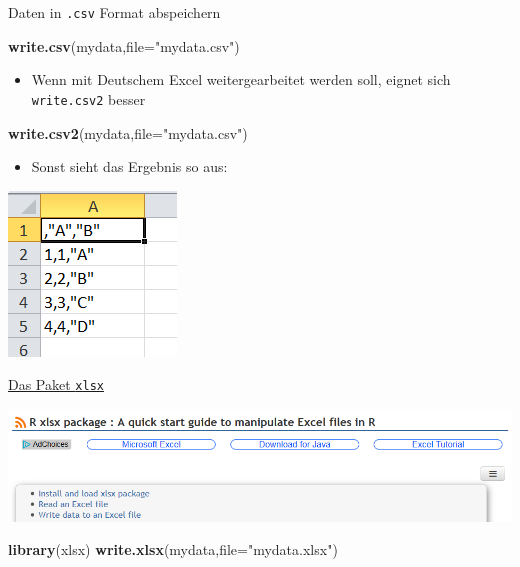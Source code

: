 \documentclass[ignorenonframetext,]{beamer}
\newenvironment{Shaded}{}{}
\newcommand{\KeywordTok}[1]{\textcolor[rgb]{0.00,0.44,0.13}{\textbf{{#1}}}}
\newcommand{\DataTypeTok}[1]{\textcolor[rgb]{0.56,0.13,0.00}{{#1}}}
\newcommand{\StringTok}[1]{\textcolor[rgb]{0.25,0.44,0.63}{{#1}}}
\newcommand{\NormalTok}[1]{{#1}}
\providecommand{\tightlist}{%
\setlength{\itemsep}{0pt}\setlength{\parskip}{0pt}}
\begin{document}
\begin{frame}[fragile]{Daten in \texttt{.csv} Format abspeichern}

\begin{Shaded}
\begin{Highlighting}[]
\KeywordTok{write.csv}\NormalTok{(mydata,}\DataTypeTok{file=}\StringTok{"mydata.csv"}\NormalTok{) }
\end{Highlighting}
\end{Shaded}

\begin{itemize}
\tightlist
\item
  Wenn mit Deutschem Excel weitergearbeitet werden soll, eignet sich
  \texttt{write.csv2} besser
\end{itemize}

\begin{Shaded}
\begin{Highlighting}[]
\KeywordTok{write.csv2}\NormalTok{(mydata,}\DataTypeTok{file=}\StringTok{"mydata.csv"}\NormalTok{) }
\end{Highlighting}
\end{Shaded}

\begin{itemize}
\tightlist
\item
  Sonst sieht das Ergebnis so aus:
\end{itemize}

\includegraphics{./tex2pdf.956/18fa31a6671691665971d435cb85f1252e5f17a0.png}

\end{frame}

\begin{frame}[fragile]{\href{http://www.sthda.com/english/wiki/r-xlsx-package-a-quick-start-guide-to-manipulate-excel-files-in-r\#read-an-excel-file}{Das
Paket \texttt{xlsx}}}

\includegraphics{./tex2pdf.956/f8e4fe7da5e630832ec7e1566b80a8d388b852cb.png}

\begin{Shaded}
\begin{Highlighting}[]
\KeywordTok{library}\NormalTok{(xlsx)}
\KeywordTok{write.xlsx}\NormalTok{(mydata,}\DataTypeTok{file=}\StringTok{"mydata.xlsx"}\NormalTok{) }
\end{Highlighting}
\end{Shaded}

\end{frame}
\end{document}
